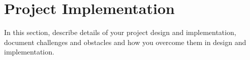 \section{Project Implementation}
In this section, describe details of your project design and implementation, document challenges and obstacles and how you overcome them in design and implementation. 
